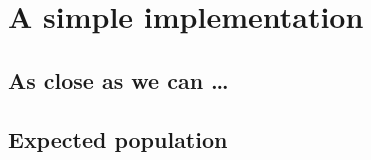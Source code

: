 \section{A simple implementation}

\subsection{As close as we can \dots}

\subsection{Expected population}
